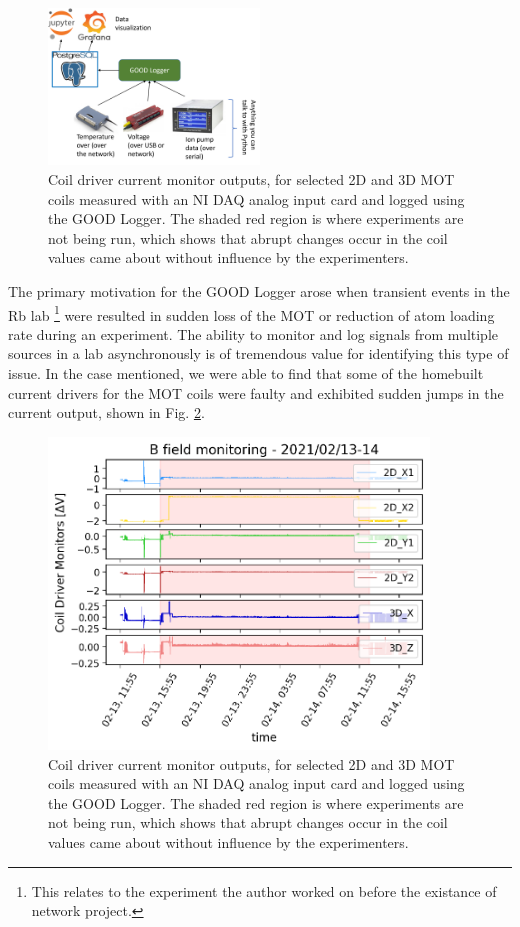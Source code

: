 \begin{figure}[!ht]
    \centering
    \includegraphics[width=0.5\textwidth]{Images/good_logger_with_postgres.png}
    \caption{Coil driver current monitor outputs, for selected 2D and 3D MOT coils measured with an NI DAQ analog input card and logged using the GOOD Logger. The shaded red region is where experiments are not being run, which shows that abrupt changes occur in the coil values came about without influence by the experimenters.}
    \label{fig:goodlogger}
\end{figure}


The primary motivation for the GOOD Logger arose when transient events in the Rb lab \footnote{This relates to the experiment the author worked on before the existance of network project.} were resulted in sudden loss of the MOT or reduction of atom loading rate during an experiment. The ability to monitor and log signals from multiple sources in a lab asynchronously is of tremendous value for identifying this type of issue. In the case mentioned, we were able to find that some of the homebuilt current drivers for the MOT coils were faulty and exhibited sudden jumps in the current output, shown in Fig. \ref{fig:coiljumps}.

\begin{figure}[!ht]
    \centering
    \includegraphics[width=0.9\textwidth]{Images/goodlogger_coil_jumps_20210213_14.pdf}
    \caption{Coil driver current monitor outputs, for selected 2D and 3D MOT coils measured with an NI DAQ analog input card and logged using the GOOD Logger. The shaded red region is where experiments are not being run, which shows that abrupt changes occur in the coil values came about without influence by the experimenters.}
    \label{fig:coiljumps}
\end{figure}



